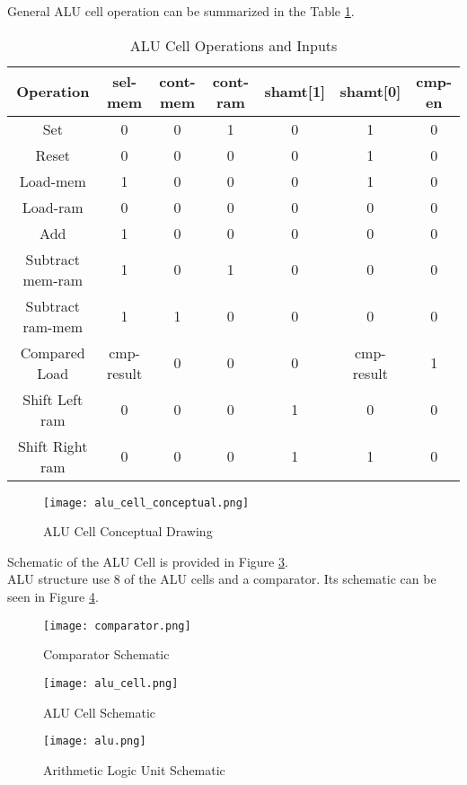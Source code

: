 \documentclass[12pt]{article}
\begin{document}
General ALU cell operation can be summarized in the Table \ref{alu_modes}.


\begin{table}
\centering
\begin{tabular}{|c|c|c|c|c|c|c|}
\hline 
\textbf{Operation} & \textbf{sel-mem} & \textbf{cont-mem} & \textbf{cont-ram} & \textbf{shamt[1]} & \textbf{shamt[0]} & \textbf{cmp-en} \\ 
\hline 
Set & 0 & 0 & 1 & 0 & 1 & 0 \\ 
\hline 
Reset & 0 & 0 & 0 & 0 & 1 & 0 \\ 
\hline 
Load-mem & 1 & 0 & 0 & 0 & 1 & 0 \\ 
\hline 
Load-ram & 0 & 0 & 0 & 0 & 0 & 0 \\ 
\hline 
Add & 1 & 0 & 0 & 0 & 0 & 0 \\ 
\hline 
Subtract mem-ram & 1 & 0 & 1 & 0 & 0 & 0 \\ 
\hline 
Subtract ram-mem & 1 & 1 & 0 & 0 & 0 & 0 \\ 
\hline 
Compared Load & cmp-result & 0 & 0 & 0 & cmp-result & 1 \\ 
\hline 
Shift Left ram & 0 & 0 & 0 & 1 & 0 & 0 \\ 
\hline 
Shift Right ram & 0 & 0 & 0 & 1 & 1 & 0 \\ 
\hline 
\end{tabular} 
\caption{ALU Cell Operations and Inputs}
\label{alu_modes}
\end{table}


\begin{figure}[H]
\centering
\texttt{[image: alu\_cell\_conceptual.png]}
\caption{ALU Cell Conceptual Drawing}
\label{alu_cell_conceptual}
\end{figure}


Schematic of the ALU Cell is provided in Figure \ref{alu_cell}.\\

ALU structure use 8 of the ALU cells and a comparator. Its schematic can be seen in Figure \ref{alu_sch}.

\begin{landscape}

\begin{figure}[H]
\centering
\texttt{[image: comparator.png]}
\caption{Comparator Schematic}
\label{comparator}
\end{figure}


\pagestyle{empty}
\begin{figure}[H]
\centering
\texttt{[image: alu\_cell.png]}
\caption{ALU Cell Schematic}
\label{alu_cell}
\end{figure}


\begin{figure}[H]
\centering
\texttt{[image: alu.png]}
\caption{Arithmetic Logic Unit Schematic}
\label{alu_sch}
\end{figure}


\end{landscape}
\end{document}
